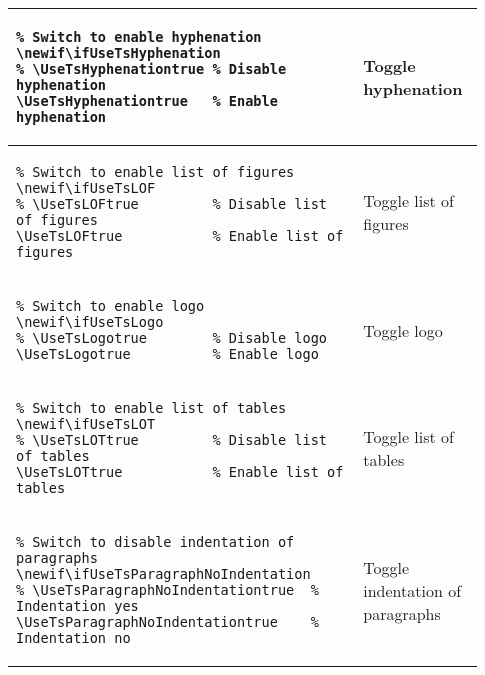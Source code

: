 \begin{footnotesize}
\begin{longtable}{ | P{0.7\linewidth} | p{0.23\linewidth} | }
        \begin{BVerbatim}
\newif\ifUseTsHyphenation
\UseTsHyphenationtrue   %
        \end{BVerbatim}
         & Toggle \newline hyphenation                                         \\
        \hline
        \begin{BVerbatim}
\newif\ifUseTsLOF
\UseTsLOFtrue           %
        \end{BVerbatim}
         & Toggle list \newline of figures                                     \\
        \hline
        \begin{BVerbatim}
\newif\ifUseTsLogo
\UseTsLogotrue          %
        \end{BVerbatim}
         & Toggle logo                                                         \\
        \hline
        \begin{BVerbatim}
\newif\ifUseTsLOT
\UseTsLOTtrue           %
        \end{BVerbatim}
         & Toggle list \newline of tables                                      \\
        \hline
        \begin{BVerbatim}
\newif\ifUseTsParagraphNoIndentation
\UseTsParagraphNoIndentationtrue    %
        \end{BVerbatim}
         & Toggle indentation \newline of paragraphs                           \\
        \hline

\end{longtable}
\end{footnotesize}
